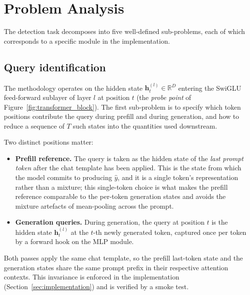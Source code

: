 \section{Problem Analysis}
\label{sec:problem_analysis}

The detection task decomposes into five well-defined sub-problems, each of
which corresponds to a specific module in the implementation.

\subsection{Query identification}
\label{subsec:query_id}

The methodology operates on the hidden state $\mathbf{h}_t^{(l)} \in
\mathbb{R}^D$ entering the SwiGLU feed-forward sublayer of layer $l$ at
position $t$ (the \emph{probe point} of
Figure~\ref{fig:transformer_block}). The first sub-problem is to specify
which token positions contribute the query during prefill and during
generation, and how to reduce a sequence of $T$ such states into the
quantities used downstream.

Two distinct positions matter:

\begin{itemize}[leftmargin=*]
    \item \textbf{Prefill reference.} The query is taken as the hidden
          state of the \emph{last prompt token} after the chat template has
          been applied. This is the state from which the model commits to
          producing $\hat{y}$, and it is a single token's representation
          rather than a mixture; this single-token choice is what makes
          the prefill reference comparable to the per-token generation
          states and avoids the mixture artefacts of mean-pooling across
          the prompt.
    \item \textbf{Generation queries.} During generation, the query at
          position $t$ is the hidden state $\mathbf{h}_t^{(l)}$ at the
          $t$-th newly generated token, captured once per token by a
          forward hook on the MLP module.
\end{itemize}

Both passes apply the same chat template, so the prefill last-token state
and the generation states share the same prompt prefix in their respective
attention contexts. This invariance is enforced in the implementation
(Section~\ref{sec:implementation}) and is verified by a smoke test.

